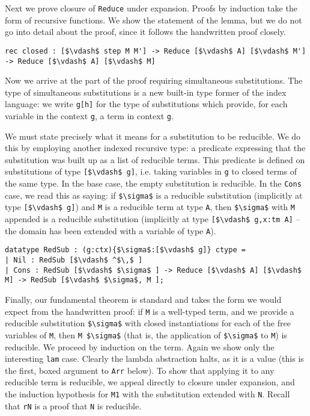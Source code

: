 \documentclass{article}
\begin{document}
Next we prove closure of \lstinline{Reduce} under expansion. Proofs
by induction take the form of recursive functions. We show the
statement of the lemma, but we do not go into detail about the proof,
since it follows the handwritten proof closely.

\begin{lstlisting}
rec closed : [$\vdash$ step M M'] -> Reduce [$\vdash$ A] [$\vdash$ M'] -> Reduce [$\vdash$ A] [$\vdash$ M]
\end{lstlisting}

Now we arrive at the part of the proof requiring simultaneous
substitutions. The type of simultaneous substitutions is a new built-in
type former of the index language: we write \lstinline{g[h]} for the
type of substitutions which provide, for each variable in the context
\lstinline{g}, a term in context \lstinline{g}.

We must state precisely what it means for a substitution to be
reducible. We do this by employing another indexed recursive type: a predicate
expressing that the substitution was built up as a list of reducible
terms. This predicate is defined on substitutions of type
\lstinline{[$\vdash$ g]}, i.e. taking variables in \lstinline{g} to closed
terms of the same type. In the base case, the
empty substitution is reducible. In the \lstinline{Cons} case, we read
this as saying: if \lstinline{$\sigma$} is a reducible substitution
(implicitly at type \lstinline{[$\vdash$ g]}) and \lstinline{M} is a reducible
term at type \lstinline{A}, then \lstinline{$\sigma$} with \lstinline{M}
appended is a reducible substitution (implicitly at type
\lstinline{[$\vdash$ g,x:tm A]} -- the domain has been extended with a
variable of type \lstinline{A}).

\begin{lstlisting}
datatype RedSub : (g:ctx){$\sigma$:[$\vdash$ g]} ctype =
| Nil : RedSub [$\vdash$ ^$\,$ ]
| Cons : RedSub [$\vdash$ $\sigma$ ] -> Reduce [$\vdash$ A] [$\vdash$ M] -> RedSub [$\vdash$ $\sigma$, M ];
\end{lstlisting}


Finally, our fundamental theorem is standard and takes the form we would expect
from the handwritten proof: if \lstinline{M} is a well-typed
term, and we provide a reducible substitution \lstinline{$\sigma$} with closed
instantiations for each of the free variables of \lstinline{M}, then
\lstinline{M $\sigma$} (that is, the application of \lstinline{$\sigma$} to
\lstinline{M}) is reducible. We proceed by induction on the
term. Again we show only the interesting \lstinline{lam} case. Clearly
the lambda abstraction halts, as it is a value (this is the first,
boxed argument to \lstinline{Arr} below). To show 
that applying it to any reducible term is reducible, we appeal directly to
closure under expansion, and the induction hypothesis for
\lstinline{M1} with the substitution extended with
\lstinline{N}. Recall that \lstinline{rN} is a proof that
\lstinline{N} is reducible.
\end{document}
